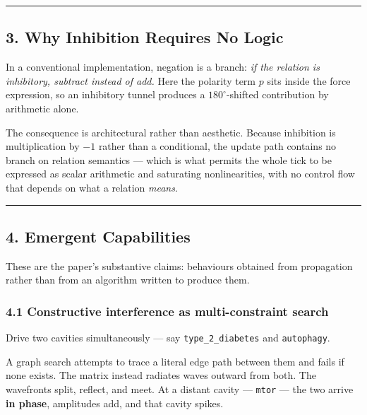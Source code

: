\documentclass[
  11pt,
  a4paper,
]{article}
\begin{document}
\begin{center}\rule{0.5\linewidth}{0.5pt}\end{center}

\subsection{3. Why Inhibition Requires No
Logic}\label{why-inhibition-requires-no-logic}

In a conventional implementation, negation is a branch: \emph{if the
relation is inhibitory, subtract instead of add.} Here the polarity term
\(p\) sits inside the force expression, so an inhibitory tunnel produces
a \(180^\circ\)-shifted contribution by arithmetic alone.

The consequence is architectural rather than aesthetic. Because
inhibition is multiplication by \(-1\) rather than a conditional, the
update path contains no branch on relation semantics --- which is what
permits the whole tick to be expressed as scalar arithmetic and
saturating nonlinearities, with no control flow that depends on what a
relation \emph{means}.

\begin{center}\rule{0.5\linewidth}{0.5pt}\end{center}

\subsection{4. Emergent Capabilities}\label{emergent-capabilities}

These are the paper's substantive claims: behaviours obtained from
propagation rather than from an algorithm written to produce them.

\subsubsection{4.1 Constructive interference as multi-constraint
search}\label{constructive-interference-as-multi-constraint-search}

Drive two cavities simultaneously --- say \texttt{type\_2\_diabetes} and
\texttt{autophagy}.

A graph search attempts to trace a literal edge path between them and
fails if none exists. The matrix instead radiates waves outward from
both. The wavefronts split, reflect, and meet. At a distant cavity ---
\texttt{mtor} --- the two arrive \textbf{in phase}, amplitudes add, and
that cavity spikes.
\end{document}
